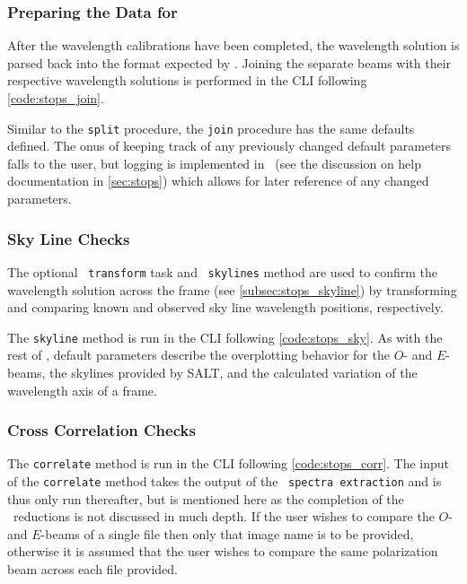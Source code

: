 \subsubsection{Preparing the Data for \polsalt}

After the wavelength calibrations have been completed, the wavelength solution is parsed back into the format expected by \polsalt. Joining the separate beams with their respective wavelength solutions is performed in the \gls{CLI} following \autoref{code:stops_join}.

Similar to the \texttt{split} procedure, the \texttt{join} procedure has the same defaults defined. The onus of keeping track of any previously changed default parameters falls to the user, but logging is implemented in \stops\ (see the discussion on help documentation in \autoref{sec:stops}) which allows for later reference of any changed parameters.

\subsubsection{Sky Line Checks} \label{subsec:reduc_sky}

The optional \iraf\ \texttt{transform} task and \stops\ \texttt{skylines} method are used to confirm the wavelength solution across the frame (see \autoref{subsec:stops_skyline}) by transforming and comparing known and observed sky line wavelength positions, respectively.

The \texttt{skyline} method is run in the \gls{CLI} following \autoref{code:stops_sky}. As with the rest of \stops, default parameters describe the overplotting behavior for the $O$- and $E$-beams, the skylines provided by \gls{SALT}, and the calculated variation of the wavelength axis of a frame.

\subsubsection{Cross Correlation Checks} \label{subsec:reduc_corr}

The \texttt{correlate} method is run in the \gls{CLI} following \autoref{code:stops_corr}. The input of the \texttt{correlate} method takes the output of the \polsalt\ \texttt{spectra extraction} and is thus only run thereafter, but is mentioned here as the completion of the \polsalt\ reductions is not discussed in much depth. If the user wishes to compare the $O$- and $E$-beams of a single file then only that image name is to be provided, otherwise it is assumed that the user wishes to compare the same polarization beam across each file provided.

